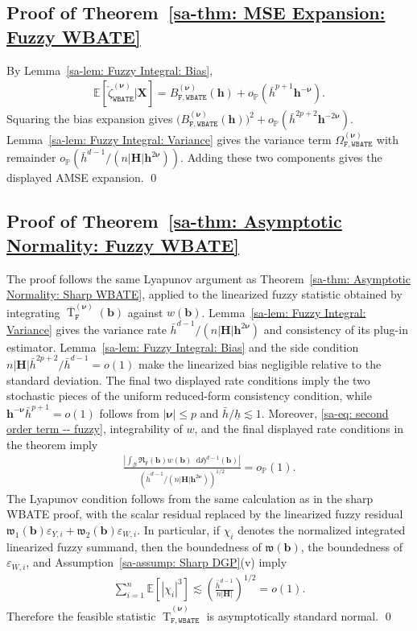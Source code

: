 \documentclass[10pt]{article}
\DeclareMathOperator{\Tstat}{T}
\renewcommand{\P}{\mathbb{P}}
\newcommand{\E}{\mathbb{E}}
\newcommand{\Haus}{\mathfrak{H}}
\newcommand{\dif}{\mathop{}\!\mathrm{d}}
\newcommand{\bb}{\mathbf{b}}
\newcommand{\bh}{\mathbf{h}}
\newcommand{\bH}{\mathbf{H}}
\newcommand{\bX}{\mathbf{X}}
\newcommand{\bnu}{\boldsymbol{\nu}}
\newcommand{\B}{\mathcal{B}}
\begin{document}
\subsection{Proof of Theorem~\ref{sa-thm: MSE Expansion: Fuzzy WBATE}}

By Lemma~\ref{sa-lem: Fuzzy Integral: Bias},
\begin{align*}
    \E[\check{\zeta}_{\mathtt{WBATE}}^{(\bnu)}|\bX]
    = B_{\mathtt{F,WBATE}}^{(\bnu)}(\bh)+o_{\P}(\bar{h}^{p+1}\bh^{-\bnu}).
\end{align*}
Squaring the bias expansion gives $\big(B_{\mathtt{F,WBATE}}^{(\bnu)}(\bh)\big)^2+o_{\P}(\bar{h}^{2p+2}\bh^{-2\bnu})$. Lemma~\ref{sa-lem: Fuzzy Integral: Variance} gives the variance term $\Omega_{\mathtt{F,WBATE}}^{(\bnu)}$ with remainder $o_{\P}(\bar{h}^{d-1}/(n|\bH|\bh^{2\bnu}))$. Adding these two components gives the displayed AMSE expansion.
\qed

\subsection{Proof of Theorem~\ref{sa-thm: Asymptotic Normality: Fuzzy WBATE}}

The proof follows the same Lyapunov argument as Theorem~\ref{sa-thm: Asymptotic Normality: Sharp WBATE}, applied to the linearized fuzzy statistic obtained by integrating $\overline{\Tstat}^{(\bnu)}_{\mathtt{F}}(\bb)$ against $w(\bb)$. Lemma~\ref{sa-lem: Fuzzy Integral: Variance} gives the variance rate $\bar{h}^{d-1}/(n|\bH|\bh^{2\bnu})$ and consistency of its plug-in estimator. Lemma~\ref{sa-lem: Fuzzy Integral: Bias} and the side condition $n|\bH|\bar{h}^{2p+2}/\bar{h}^{d-1}=o(1)$ make the linearized bias negligible relative to the standard deviation. The final two displayed rate conditions imply the two stochastic pieces of the uniform reduced-form consistency condition, while $\bh^{-\bnu}\bar h^{p+1}=o(1)$ follows from $|\bnu|\le p$ and $\bar h/\underline h\lesssim1$. Moreover, \eqref{sa-eq: second order term -- fuzzy}, integrability of $w$, and the final displayed rate conditions in the theorem imply
\begin{align*}
    \frac{\left|\int_{\B} \mathfrak{R}_{\mathtt{F}}(\bb) w(\bb)\dif\Haus^{d-1}(\bb)\right|}
    {\left(\bar{h}^{d-1}/(n|\bH|\bh^{2\bnu})\right)^{1/2}}
    =o_{\P}(1).
\end{align*}
The Lyapunov condition follows from the same calculation as in the sharp WBATE proof, with the scalar residual replaced by the linearized fuzzy residual $\mathfrak{w}_1(\bb)\varepsilon_{Y,i}+\mathfrak{w}_2(\bb)\varepsilon_{W,i}$. In particular, if $\chi_i$ denotes the normalized integrated linearized fuzzy summand, then the boundedness of $\mathfrak{w}(\bb)$, the boundedness of $\varepsilon_{W,i}$, and Assumption~\ref{sa-assump: Sharp DGP}(v) imply
\begin{align*}
    \sum_{i=1}^n \E[|\chi_i|^3]
    \lesssim
    \left(\frac{\bar{h}^{d-1}}{n|\bH|}\right)^{1/2}
    = o(1).
\end{align*}
Therefore the feasible statistic $\widehat{\Tstat}_{\mathtt{F,WBATE}}^{(\bnu)}$ is asymptotically standard normal.
\qed
\end{document}
